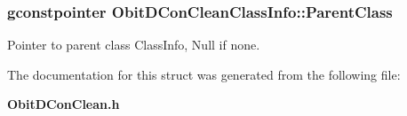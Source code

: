 \subsubsection{\setlength{\rightskip}{0pt plus 5cm}gconstpointer {\bf Obit\-DCon\-Clean\-Class\-Info::Parent\-Class}}\label{structObitDConCleanClassInfo_o3}


Pointer to parent class Class\-Info, Null if none. 



The documentation for this struct was generated from the following file:\begin{CompactItemize}
\item 
{\bf Obit\-DCon\-Clean.h}\end{CompactItemize}
